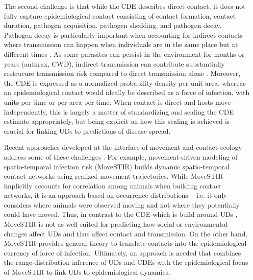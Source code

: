 \documentclass[letterpaper]{article}
\begin{document}
The second challenge is that while the CDE describes direct contact, it does not fully capture epidemiological contact consisting of contact formation, contact duration, pathogen acquisition, pathogen shedding, and pathogen decay. Pathogen decay is particularly important when accounting for indirect contacts where transmission can happen when individuals are in the same place but at different times \citep{Wilber2022,Yang2023,Richardson2015}.  As some parasites can persist in the environment for months or years (anthrax, CWD), indirect transmission can contribute substantially restrucure transmission risk compared to direct transmission alone \citep{Yang2023}.  Moreover, the CDE is expressed as a normalized probability density per unit area, whereas an epidemiological contact would ideally be described as a force of infection, with units per time or per area per time.  When contact is direct and hosts move independently, this is largely a matter of standardizing and scaling the CDE estimate appropriately, but being explicit on how this scaling is achieved is crucial for linking UDs to predictions of disease spread.

Recent approaches developed at the interface of movement and contact ecology address some of these challenges \citep{Wilber2022,Yang2023}. For example, movement-driven modeling of spatio-temporal infection risk (MoveSTIR) builds dynamic spatio-temporal contact networks using realized movement trajectories. While MoveSTIR implicitly accounts for correlation among animals when building contact networks, it is an approach based on occurrence distributions \citep{Alston2022} -- i.e. it only considers where animals were observed moving and not where they potentially could have moved. Thus, in contrast to the CDE which is build around UDs \citep[a range-distribution method in the terminology of][]{Alston2022}, MoveSTIR is not as well-suited for predicting how social or environmental changes affect UDs and thus affect contact and transmission.  On the other hand, MoveSTIR provides general theory to translate contacts into the epidemiological currency of force of infection. Ultimately, an approach is needed that combines the range-distribution inference of UDs and CDEs \citep{Alston2022,Noonan2021} with the epidemiological focus of MoveSTIR to link UDs to epidemiological dynamics. 
\end{document}
